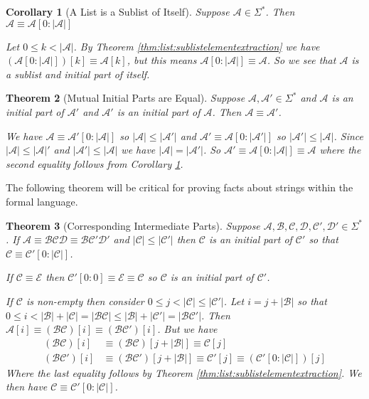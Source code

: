 \documentclass[12pt]{article}
\theoremstyle{break}
\theoremstyle{break}
\newtheorem{theorem}{Theorem}[section]
\theoremstyle{break}
\newtheorem{corollary}[theorem]{Corollary}
\theoremstyle{break}
\theoremstyle{break}
\newtheorem{informal definition}[definition]{Informal Definition}
\newcommand{\mc}[1]{\mathcal{#1}}
\begin{document}
\begin{corollary}[A List is a Sublist of Itself]
\label{corr:list:listsublistself}
Suppose $\mc{A}\in\Sigma^*$.
Then $\mc{A}\equiv \mc{A}[0:|\mc{A}|]$

Let $0\le k < |\mc{A}|$.
By Theorem \ref{thm:list:sublistelementextraction} we have $(\mc{A}[0:|\mc{A}|])[k] \equiv \mc{A}[k]$, but this means $\mc{A}[0:|\mc{A}|] \equiv \mc{A}$.
So we see that $\mc{A}$ is a sublist and initial part of itself.
\end{corollary}

\begin{theorem}[Mutual Initial Parts are Equal]
Suppose $\mc{A}, \mc{A}'\in \Sigma^*$ and $\mc{A}$ is an initial part of $\mc{A}'$ and $\mc{A}'$ is an initial part of $\mc{A}$.
Then $\mc{A}\equiv \mc{A}'$.

We have $\mc{A} \equiv \mc{A}'[0:|\mc{A}|]$ so $|\mc{A}| \le|\mc{A}'|$ and $\mc{A}'\equiv \mc{A}[0:|\mc{A}'|]$ so $|\mc{A}'| \le |\mc{A}|$.
Since $|\mc{A}|\le |\mc{A}|'$ and $|\mc{A}'| \le |\mc{A}|$ we have $|\mc{A}| = |\mc{A}'|$.
So $\mc{A}' \equiv \mc{A}[0:|\mc{A}|] \equiv \mc{A}$ where the second equality follows from Corollary \ref{corr:list:listsublistself}.
\end{theorem}

The following theorem will be critical for proving facts about strings within the formal language.

\begin{theorem}[Corresponding Intermediate Parts]
\label{thm:list:correspondingintermediateparts}
Suppose $\mc{A}, \mc{B}, \mc{C}, \mc{D}, \mc{C}', \mc{D}'\in \Sigma^*$.
If $\mc{A}\equiv \mc{B}\mc{C}\mc{D} \equiv \mc{B}\mc{C}'\mc{D}'$ and $|\mc{C}|\le|\mc{C}'|$ then $\mc{C}$ is an initial part of $\mc{C}'$ so that $\mc{C}\equiv \mc{C}'[0:|\mc{C}|]$.

If $\mc{C}\equiv \mc{E}$ then $\mc{C}'[0:0] \equiv \mc{E} \equiv \mc{C}$ so $\mc{C}$ is an initial part of $\mc{C}'$.

If $\mc{C}$ is non-empty then consider $0\le j < |\mc{C}| \le |\mc{C}'|$.
Let $i=j + |\mc{B}|$ so that $0 \le i < |\mc{B}|+|\mc{C}| = |\mc{B}\mc{C}| \le |\mc{B}|+|\mc{C}'| = |\mc{B}\mc{C}'|$.
Then $\mc{A}[i] \equiv (\mc{B}\mc{C})[i] \equiv (\mc{B}\mc{C}')[i]$.
But we have
\begin{align*}
(\mc{B}\mc{C})[i] &\equiv (\mc{B}\mc{C})[j + |\mc{B}|] \equiv \mc{C}[j] \\
(\mc{B}\mc{C}')[i] &\equiv (\mc{B}\mc{C}')[j+|\mc{B}|] \equiv \mc{C}'[j] \equiv (\mc{C}'[0:|\mc{C}|])[j]
\end{align*}
Where the last equality follows by Theorem \ref{thm:list:sublistelementextraction}.
We then have $\mc{C}\equiv \mc{C}'[0:|\mc{C}|]$.
\end{theorem}
\end{document}
